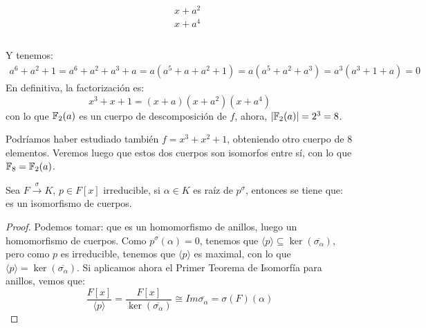 \begin{ejemplo}
\begin{equation*}
\begin{array}{r|c}
\begin{array}{rcrcc}
            \end{array} & 
            \begin{array}{l}
                x+a^2 \\
                \hline
                x+a^4 \\ \\ \\ \\
            \end{array}
        \end{array}
    \end{equation*}
    Y tenemos:
    \begin{align*}
        a^6+a^2+1 = a^6+a^2 +a^3 +a = a(a^5+a+a^2+1) = a(a^5+a^2+a^3) = a^3(a^3 + 1 + a) = 0
    \end{align*}
    En definitiva, la factorización es:
    \begin{equation*}
        x^3+x+1 = (x+a)(x+a^2)(x+a^4)
    \end{equation*}
    con lo que $\mathbb{F}_2(a)$ es un cuerpo de descomposición de $f$, ahora, $|\mathbb{F}_2(a)| = 2^3 = 8$.

    \noindent
    Podríamos haber estudiado también $f=x^3+x^2+1$, obteniendo otro cuerpo de $8$ elementos. Veremos luego que estos dos cuerpos son isomorfos entre sí, con lo que $\mathbb{F}_8 = \mathbb{F}_2(a)$.
\end{ejemplo}

\begin{lema}\label{lema:extension}
    Sea $F\stackrel{\sigma}{\to}{K}$, $p\in F[x]$ irreducible, si $\alpha\in K$ es raíz de $p^\sigma$, entonces se tiene que:
    es un isomorfismo de cuerpos.
    \begin{proof}
        Podemos tomar:
        que es un homomorfismo de anillos, luego un homomorfismo de cuerpos. Como $p^\sigma(\alpha)=0$, tenemos que $\langle p \rangle \subseteq \ker(\overline{\sigma_\alpha})$, pero como $p$ es irreducible, tenemos que $\langle p \rangle $ es maximal, con lo que $\langle p \rangle =\ker(\overline{\sigma_\alpha})$. Si aplicamos ahora el Primer Teorema de Isomorfía para anillos, vemos que:
        \begin{equation*}
            \dfrac{F[x]}{\langle p \rangle } = \dfrac{F[x]}{\ker(\overline{\sigma_\alpha})} \cong Im \overline{\sigma_\alpha} = \sigma(F)(\alpha)
        \end{equation*}
    \end{proof}
\end{lema}

